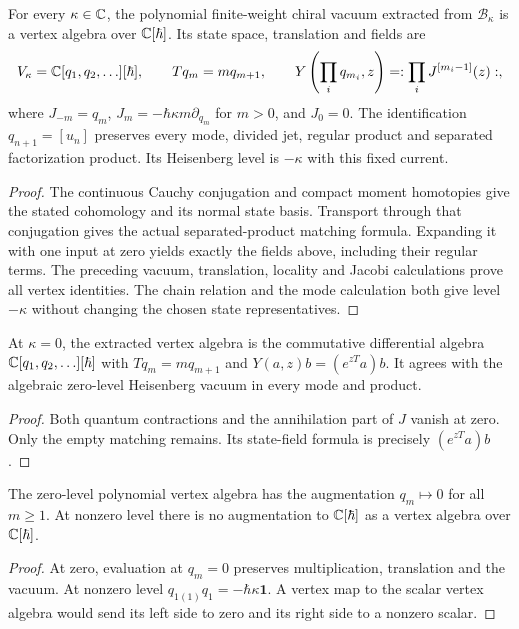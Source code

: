 \begin{theorem}
\label{thm:bf-current-all-levels}
For every $\kappa\in\mathbb C$, the polynomial finite-weight chiral vacuum
extracted from $\mathcal B_\kappa$ is a vertex algebra over
$\mathbb C[\hbar]$.  Its state space, translation and fields are
\[
 V_\kappa=\mathbb C[q_1,q_2,\ldots][\hbar],\qquad
 Tq_m=mq_{m+1},\qquad
 Y\left(\prod_iq_{m_i},z\right)=:\prod_iJ^{[m_i-1]}(z):,
\]
where $J_{-m}=q_m$, $J_m=-\hbar\kappa m\partial_{q_m}$ for $m>0$,
and $J_0=0$.  The identification $q_{n+1}=[u_n]$ preserves every
mode, divided jet, regular product and separated factorization
product.  Its Heisenberg level is $-\kappa$ with this fixed current.
\end{theorem}
\begin{proof}
The continuous Cauchy conjugation and compact moment homotopies give
the stated cohomology and its normal state basis.  Transport through
that conjugation gives the actual separated-product matching formula.
Expanding it with one input at zero yields exactly the fields above,
including their regular terms.  The preceding vacuum, translation,
locality and Jacobi calculations prove all vertex identities.
The chain relation and the mode calculation both give level
$-\kappa$ without changing the chosen state representatives.
\end{proof}

\begin{theorem}
\label{thm:bf-zero-current}
At $\kappa=0$, the extracted vertex algebra is the commutative
differential algebra $\mathbb C[q_1,q_2,\ldots][\hbar]$ with
$Tq_m=mq_{m+1}$ and $Y(a,z)b=(e^{zT}a)b$.  It agrees with the
algebraic zero-level Heisenberg vacuum in every mode and product.
\end{theorem}
\begin{proof}
Both quantum contractions and the annihilation part of $J$ vanish
at zero.  Only the empty matching remains.  Its state-field formula
is precisely $(e^{zT}a)b$.
\end{proof}

\begin{corollary}
The zero-level polynomial vertex algebra has the augmentation
$q_m\mapsto0$ for all $m\ge1$.  At nonzero level there is no
augmentation to $\mathbb C[\hbar]$ as a vertex algebra over $\mathbb C[\hbar]$.
\end{corollary}
\begin{proof}
At zero, evaluation at $q_m=0$ preserves multiplication, translation
and the vacuum.  At nonzero level $q_{1(1)}q_1=-\hbar\kappa\mathbf1$.
A vertex map to the scalar vertex algebra would send its left side
to zero and its right side to a nonzero scalar.
\end{proof}

